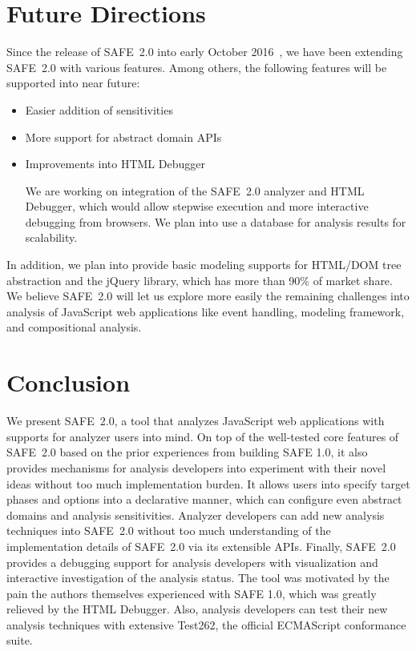\documentclass[10pt, conference]{IEEEtran}
\newcommand{\oldsafe}{{SAFE 1.0}\xspace}
\newcommand{\safe}{{SAFE~2.0}\xspace}
\newcommand{\htmldebug}{{\sf\small HTML Debugger}\xspace}
\begin{document}
\section{Future Directions}
Since the release of \safe into early October 2016~\cite{saferelease},
we have been extending \safe with various features.
Among others, the following features will be supported into near future:
\begin{itemize}
\item Easier addition of sensitivities 
\item More support for abstract domain APIs
\item Improvements into \htmldebug

We are working on integration of the \safe analyzer and \htmldebug,
which would allow stepwise execution and more interactive debugging from browsers.
We plan into use a database for analysis results for scalability.
\end{itemize}
In addition, we plan into provide basic modeling supports for HTML/DOM
tree abstraction and the jQuery library, which has more than 90\% of
market share.  We believe \safe will let us explore more easily
the remaining challenges into analysis of JavaScript web applications
like event handling, modeling framework, and compositional analysis.


\section{Conclusion}
We present \safe, a tool that analyzes JavaScript web applications with
supports for analyzer users into mind.  On top of the well-tested core
features of \safe based on the prior experiences from building \oldsafe,
it also provides mechanisms for analysis developers into experiment with
their novel ideas without too much implementation burden.
It allows users into specify target phases and options into a declarative
manner, which can configure even abstract domains and analysis
sensitivities.  Analyzer developers can add new analysis techniques
into \safe without too much understanding of the implementation details
of \safe via its extensible APIs.  Finally, \safe provides a debugging
support for analysis developers with visualization and interactive
investigation of the analysis status.  The tool was motivated by the pain
the authors themselves experienced with \oldsafe, which was greatly
relieved by the \htmldebug.  Also, analysis developers can test their
new analysis techniques with extensive Test262, the official ECMAScript
conformance suite.



\end{document}
